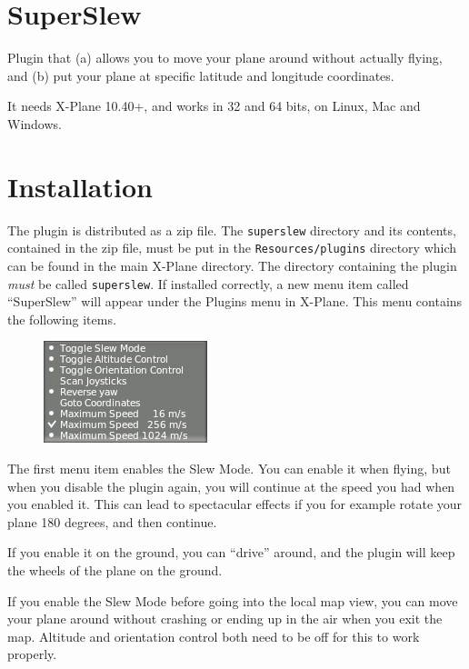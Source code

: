 \documentclass[a4paper,12pt]{article}
\begin{document}
\section*{SuperSlew}

Plugin that (a) allows you to move your plane around without actually
flying, and (b) put your plane at specific latitude and longitude coordinates.

\vspace{0.5\baselineskip}
It needs X-Plane 10.40+, and works in 32 and 64 bits, on Linux, Mac
and Windows.

\section*{Installation}

The plugin is distributed as a zip file. The \texttt{superslew}
directory and its contents, contained in the zip file, must be put in
the \texttt{Resources/plugins} directory which can be found in the
main X-Plane directory. The directory containing the plugin
\textsl{must} be called \texttt{superslew}. If installed correctly, a
new menu item called ``SuperSlew'' will appear under the Plugins menu
in X-Plane. This menu contains the following items. 

\begin{figure}[h!]%
\centering
\includegraphics[scale=1]{slewstandard.png}
\label{fig:infowindow}
\end{figure}

The first menu item enables the Slew Mode. You can enable it when
flying, but when you disable the plugin again, you will continue at
the speed you had when you enabled it. This can lead to spectacular
effects if you for example rotate your plane 180 degrees, and then
continue. 

If you enable it on the ground, you can ``drive'' around, and the
plugin will keep the wheels of the plane on the ground.

If you enable the Slew Mode before going into the local map view, you
can move your plane around without crashing or ending up in the air
when you exit the map. Altitude and orientation control both need to be off for
this to work properly.
\end{document}
